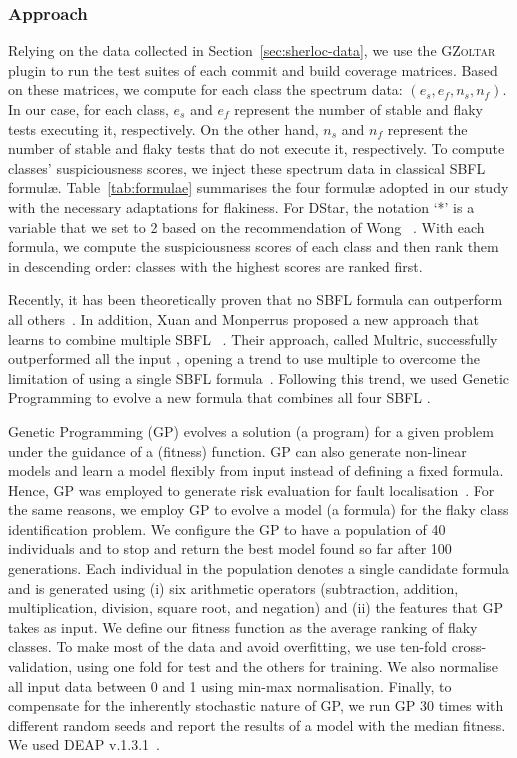 \subsubsection{Approach}\label{subsub:rq1_approach}
Relying on the data collected in Section~\ref{sec:sherloc-data}, we use the \textsc{GZoltar} plugin to run the test suites of each commit and build coverage matrices.
Based on these matrices, we compute for each class the spectrum data: $(e_{s}, e_{f} , n_{s}, n_{f})$.
In our case, for each class, $e_{s}$ and $e_{f}$ represent the number of stable and flaky tests executing it, respectively.
On the other hand, $n_{s}$ and $n_{f}$ represent the number of stable and flaky tests that do not execute it, respectively.
To compute classes' suspiciousness scores, we inject these spectrum data in classical SBFL formulæ.
Table~\ref{tab:formulae} summarises the four formulæ adopted in our study with the necessary adaptations for flakiness.
For DStar, the notation ‘*’ is a variable that we set to 2 based on the recommendation of Wong \etal~\cite{wong-dstar}.
With each formula, we compute the suspiciousness scores of each class and then rank them in descending order: classes with the highest scores are ranked first.

Recently, it has been  theoretically proven that no SBFL formula can outperform all others~\cite{Yoo:2014fv}. In addition, Xuan and Monperrus proposed a new approach that learns to combine multiple SBFL \formulas~\cite{Xuan2014}. Their approach, called Multric, successfully outperformed all the input \formulas, opening a trend to use multiple \formulas to overcome the limitation of using a single SBFL formula~\cite{B.-Le:2016yu,zou2019empirical,DeepFL}. 
Following this trend, we used Genetic Programming to evolve a new formula that combines all four SBFL \formulas. 

Genetic Programming (GP) evolves a solution (\ie a program) for a given problem under the guidance of a (fitness) function. 
GP can also  generate non-linear models and learn a model flexibly from input instead of defining a fixed formula. Hence, GP was employed to generate risk evaluation \formulas for fault localisation~\cite{Yoo:2017ss,sohn-TSE}. 
For the same reasons, we employ GP to evolve a model (\ie a formula) for the flaky class identification problem. 
We configure the GP to have a population of 40 individuals and to stop and return the best model found so far after 100 generations. 
Each individual in the population denotes a single candidate formula and is generated using (i) six arithmetic operators (subtraction, addition, multiplication, division, square root, and negation) and (ii) the features that GP takes as input.
We define our fitness function as the average ranking of flaky classes. To make most of the data and avoid overfitting, we use ten-fold cross-validation, using one fold for test and the others for training. We also normalise all input data between 0 and 1 using min-max normalisation. 
Finally, to compensate for the inherently stochastic nature of GP, we run GP 30 times with different random seeds and report the results of a model with the median fitness. 
We used DEAP v.1.3.1~\cite{Fortin:2012aa}. 

